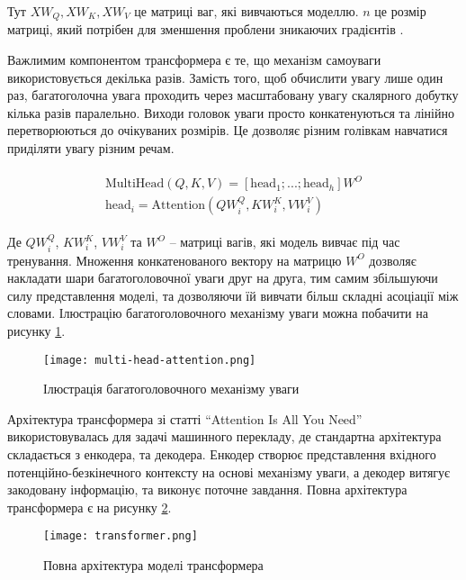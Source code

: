 Тут $XW_Q, XW_K, XW_V$ це матриці ваг, які вивчаються
моделлю. $n$ це розмір матриці, який потрібен
для зменшення проблени зникаючих градієнтів \cite{attention-all-need}.

Важлимим компонентом трансформера є те, що
механізм самоуваги використовується декілька разів.
Замість того, щоб обчислити увагу лише один раз,
багатоголочна увага проходить через масштабовану увагу
скалярного добутку кілька разів паралельно. Виходи головок
уваги просто конкатенуються та лінійно перетворюються
до очікуваних розмірів. Це дозволяє різним голівкам
навчатися приділяти увагу різним речам.

\vspace{0.5em}
\begin{gather}
\begin{aligned}
    \text{MultiHead}(Q,K,V)= [\text{head}_1; ...; \text{head}_h]W^O \\
    \text{head}_i = \text{Attention}(QW^Q_i, KW^K_i, VW^V_i)
\end{aligned}
\end{gather}
\vspace{\baselineskip}

Де $QW^Q_i$, $KW^K_i$, $VW^V_i$ та $W^O$ -- матриці вагів,
які модель вивчає під час тренування.
Множення конкатенованого вектору на матрицю $W^O$
дозволяє накладати шари багатоголовочної уваги друг на друга,
тим самим збільшуючи силу представлення моделі, та дозволяючи
їй вивчати більш складні асоціації між словами.
Ілюстрацію багатоголовочного механізму уваги можна
побачити на рисунку \ref{fig:trans-multihead}.

\begin{figure}[H]
    \centering
    \texttt{[image: multi-head-attention.png]}
    \caption{Ілюстрація багатоголовочного механізму уваги}
    \label{fig:trans-multihead}
\end{figure}

Архітектура трансформера зі статті ``Attention Is All You Need''
використовувалась для задачі машинного перекладу, де
стандартна архітектура складається з енкодера, та декодера.
Енкодер створює представлення вхідного
потенційно-безкінечного контексту
на основі механізму уваги, а декодер витягує закодовану інформацію,
та виконує поточне завдання. Повна архітектура трансформера
є на рисунку \ref{fig:trans-arch}.

\begin{figure}[H]
    \centering
    \texttt{[image: transformer.png]}
    \caption{Повна архітектура моделі трансформера}
    \label{fig:trans-arch}
\end{figure}

